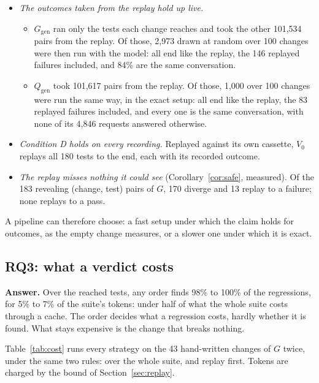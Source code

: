 \documentclass[11pt,a4paper]{article}
\newcommand{\answer}[1]{\noindent\textbf{Answer.} #1\par\smallskip}
\begin{document}
\begin{itemize}
        $G$ and $X$, and five of Qwen's 180 tests pass or fail on the current version otherwise in $X_Q$ than in
        $Q$.
  \item \emph{The outcomes taken from the replay hold up live.}
        \begin{itemize}
          \item $G_{\mathrm{gen}}$ ran only the tests each change reaches and took the other 101,534 pairs from
                the replay. Of those, 2,973 drawn at random over 100 changes were then run with the model: all end
                like the replay, the 146 replayed failures included, and 84\% are the same conversation.
          \item $Q_{\mathrm{gen}}$ took 101,617 pairs from the replay. Of those, 1,000 over 100 changes were run
                the same way, in the exact setup: all end like the replay, the 83 replayed failures included, and
                every one is the same conversation, with none of its 4,846 requests answered otherwise.
        \end{itemize}
  \item \emph{Condition D holds on every recording.} Replayed against its own cassette, $V_0$ replays all 180 tests
        to the end, each with its recorded outcome.
  \item \emph{The replay misses nothing it could see} (Corollary~\ref{cor:safe}, measured). Of the 183 revealing
        (change, test) pairs of $G$, 170 diverge and 13 replay to a failure; none replays to a pass.
\end{itemize}
A pipeline can therefore choose: a fast setup under which the claim holds for outcomes, as the empty change
measures, or a slower one under which it is exact.

\subsection{RQ3: what a verdict costs}

\answer{Over the reached tests, any order finds 98\% to 100\% of the regressions, for 5\% to 7\% of the suite's
tokens: under half of what the whole suite costs through a cache. The order decides what a regression costs,
hardly whether it is found. What stays expensive is the change that breaks nothing.}

Table~\ref{tab:cost} runs every strategy on the 43 hand-written changes of $G$ twice, under the same two rules:
over the whole suite, and replay first. Tokens are charged by the bound of Section~\ref{sec:replay}.
\end{document}
